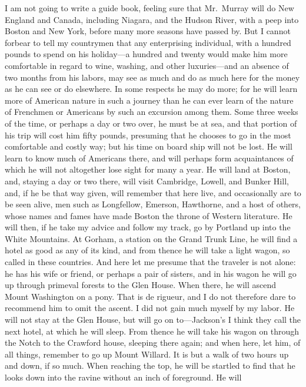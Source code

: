 I am not going to write a guide book, feeling sure that Mr.\ Murray
will do New England and Canada, including Niagara, and the Hudson
River, with a peep into Boston and New York, before many more
seasons have passed by.  But I cannot forbear to tell my countrymen
that any enterprising individual, with a hundred pounds to spend on
his holiday---a hundred and twenty would make him more comfortable
in regard to wine, washing, and other luxuries---and an absence of
two months from his labors, may see as much and do as much here for
the money as he can see or do elsewhere.  In some respects he may
do more; for he will learn more of American nature in such a
journey than he can ever learn of the nature of Frenchmen or
Americans by such an excursion among them.  Some three weeks of the
time, or perhaps a day or two over, he must be at sea, and that
portion of his trip will cost him fifty pounds, presuming that he
chooses to go in the most comfortable and costly way; but his time
on board ship will not be lost.  He will learn to know much of
Americans there, and will perhaps form acquaintances of which he
will not altogether lose sight for many a year.  He will land at
Boston, and, staying a day or two there, will visit Cambridge,
Lowell, and Bunker Hill, and, if he be that way given, will
remember that here live, and occasionally are to be seen alive, men
such as Longfellow, Emerson, Hawthorne, and a host of others, whose
names and fames have made Boston the throne of Western literature.
He will then, if he take my advice and follow my track, go by
Portland up into the White Mountains.  At Gorham, a station on the
Grand Trunk Line, he will find a hotel as good as any of its kind,
and from thence he will take a light wagon, so called in these
countries.  And here let me presume that the traveler is not alone:
he has his wife or friend, or perhaps a pair of sisters, and in his
wagon he will go up through primeval forests to the Glen House.
When there, he will ascend Mount Washington on a pony.  That is de
rigueur, and I do not therefore dare to recommend him to omit the
ascent.  I did not gain much myself by my labor.  He will not stay
at the Glen House, but will go on to---Jackson's I think they call
the next hotel, at which he will sleep.  From thence he will take
his wagon on through the Notch to the Crawford house, sleeping
there again; and when here, let him, of all things, remember to go
up Mount Willard.  It is but a walk of two hours up and down, if so
much.  When reaching the top, he will be startled to find that he
looks down into the ravine without an inch of foreground.  He will

